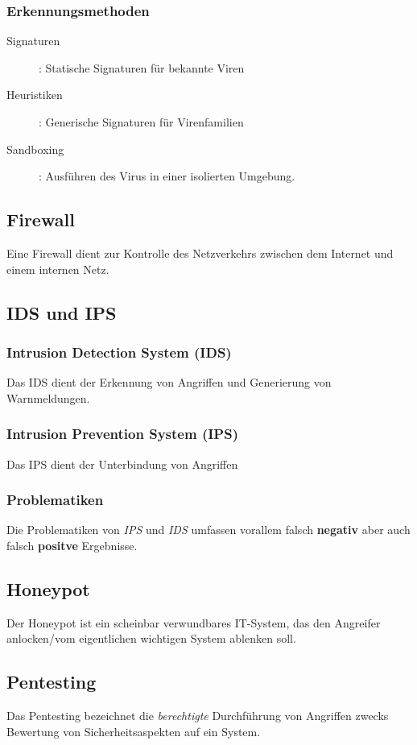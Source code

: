 \documentclass{report}
\begin{document}
\subsubsection{Erkennungsmethoden}
\begin{description}
    \item[Signaturen]: Statische Signaturen für bekannte Viren
    \item[Heuristiken]: Generische Signaturen für Virenfamilien
    \item[Sandboxing]: Ausführen des Virus in einer isolierten Umgebung.  
\end{description}
\subsection{Firewall}
Eine Firewall dient zur Kontrolle des Netzverkehrs zwischen dem Internet und einem internen Netz.
\subsection{IDS und IPS}
\subsubsection{Intrusion Detection System (IDS)}
Das IDS dient der Erkennung von Angriffen und Generierung von Warnmeldungen.
\subsubsection{Intrusion Prevention System (IPS)}
Das IPS dient der Unterbindung von Angriffen
\subsubsection{Problematiken}
Die Problematiken von \textit{IPS} und \textit{IDS} umfassen vorallem falsch \textbf{negativ} aber auch falsch \textbf{positve} Ergebnisse.
\subsection{Honeypot}
Der Honeypot ist ein scheinbar verwundbares IT-System, das den Angreifer anlocken/vom eigentlichen wichtigen System ablenken soll.
\subsection{Pentesting}
Das Pentesting bezeichnet die \textit{berechtigte} Durchführung von Angriffen zwecks Bewertung von Sicherheitsaspekten auf ein System.
\end{document}
